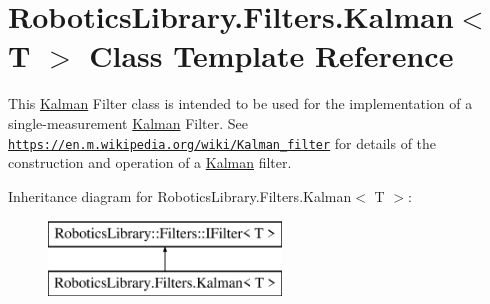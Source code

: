 \hypertarget{class_robotics_library_1_1_filters_1_1_kalman}{}\section{Robotics\+Library.\+Filters.\+Kalman$<$ T $>$ Class Template Reference}
\label{class_robotics_library_1_1_filters_1_1_kalman}


This \hyperlink{class_robotics_library_1_1_filters_1_1_kalman}{Kalman} Filter class is intended to be used for the implementation of a single-\/measurement \hyperlink{class_robotics_library_1_1_filters_1_1_kalman}{Kalman} Filter. See \href{https://en.m.wikipedia.org/wiki/Kalman_filter}{\tt https\+://en.\+m.\+wikipedia.\+org/wiki/\+Kalman\+\_\+filter} for details of the construction and operation of a \hyperlink{class_robotics_library_1_1_filters_1_1_kalman}{Kalman} filter. 


Inheritance diagram for Robotics\+Library.\+Filters.\+Kalman$<$ T $>$\+:\begin{figure}[H]
\begin{center}
\leavevmode
\includegraphics[height=2.000000cm]{d8/d85/class_robotics_library_1_1_filters_1_1_kalman}
\end{center}
\end{figure}
